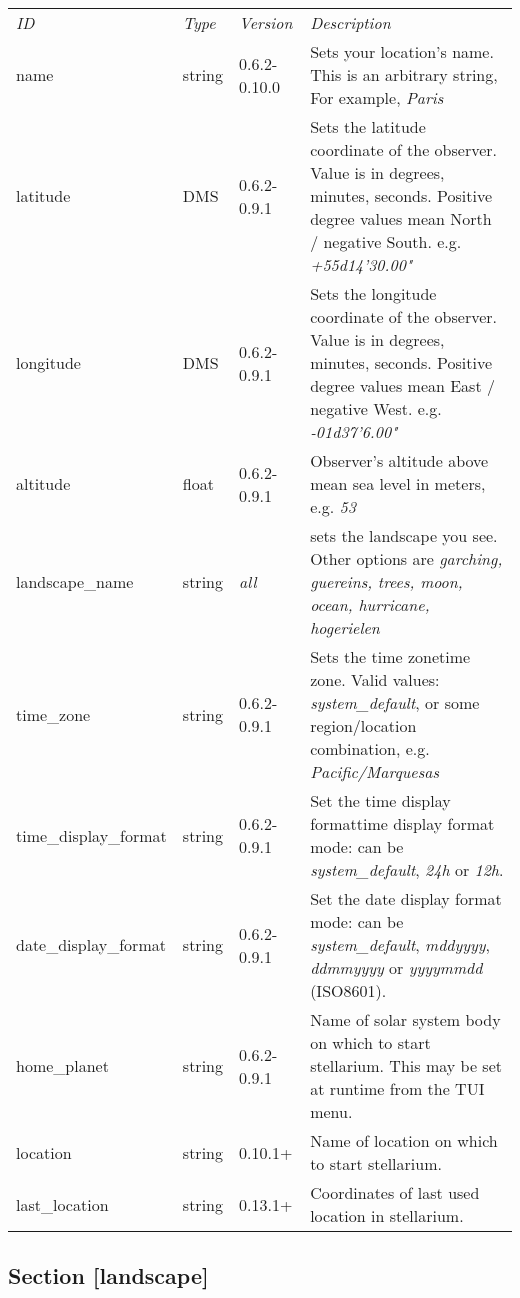\begin{longtable}[c]{@{}llll@{}}
\toprule
\emph{ID} & \emph{Type} & \emph{Version} &
\emph{Description}\tabularnewline
name & string & 0.6.2-0.10.0 & Sets your location's name. This is an
arbitrary string, For example, \emph{Paris}\tabularnewline
latitude & DMS & 0.6.2-0.9.1 & Sets the latitude coordinate of the
observer. Value is in degrees, minutes, seconds. Positive degree values
mean North / negative South. e.g. \emph{+55d14'30.00"}\tabularnewline
longitude & DMS & 0.6.2-0.9.1 & Sets the longitude coordinate of the
observer. Value is in degrees, minutes, seconds. Positive degree values
mean East / negative West. e.g. \emph{-01d37'6.00"}\tabularnewline
altitude & float & 0.6.2-0.9.1 & Observer's altitude above mean sea
level in meters, e.g. \emph{53}\tabularnewline
landscape\_name & string & \emph{all} & sets the landscape you see.
Other options are \emph{garching, guereins, trees, moon, ocean,
hurricane, hogerielen}\tabularnewline
time\_zone & string & 0.6.2-0.9.1 & Sets the time zonetime zone. Valid
values: \emph{system\_default}, or some region/location combination,
e.g. \emph{Pacific/Marquesas}\tabularnewline
time\_display\_format & string & 0.6.2-0.9.1 & Set the time display
formattime display format mode: can be \emph{system\_default},
\emph{24h} or \emph{12h}.\tabularnewline
date\_display\_format & string & 0.6.2-0.9.1 & Set the date display
format mode: can be \emph{system\_default}, \emph{mddyyyy},
\emph{ddmmyyyy} or \emph{yyyymmdd} (ISO8601).\tabularnewline
home\_planet & string & 0.6.2-0.9.1 & Name of solar system body on which
to start stellarium. This may be set at runtime from the TUI
menu.\tabularnewline
location & string & 0.10.1+ & Name of location on which to start
stellarium.\tabularnewline
last\_location & string & 0.13.1+ & Coordinates of last used location in
stellarium.\tabularnewline
\bottomrule
\end{longtable}

\subsection{Section {[}landscape{]}}\label{section-landscape}

